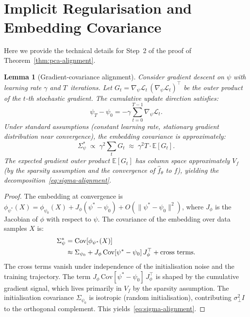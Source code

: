 \documentclass[11pt,a4paper]{article}
\theoremstyle{plain}
\newtheorem{lemma}[theorem]{Lemma}
\theoremstyle{definition}
\theoremstyle{remark}
\newcommand{\E}{\mathbb{E}}
\newcommand{\cL}{\mathcal{L}}
\newcommand{\norm}[1]{\| #1 \|}
\begin{document}
\appendix
\section{Implicit Regularisation and Embedding Covariance}%
\label{app:implicit-reg}

Here we provide the technical details for Step~2 of the proof of
Theorem~\ref{thm:pca-alignment}.

\begin{lemma}[Gradient-covariance alignment]\label{lem:grad-cov}
Consider gradient descent on $\psi$ with learning rate $\gamma$ and
$T$~iterations.  Let $G_t = \nabla_\psi \cL_t\,(\nabla_\psi \cL_t)^\top$ be the
outer product of the $t$-th stochastic gradient.  The cumulative update
direction satisfies:
\begin{equation}
  \psi_T - \psi_0
  = -\gamma \sum_{t=0}^{T-1} \nabla_\psi \cL_t.
\end{equation}
Under standard assumptions (constant learning rate, stationary gradient
distribution near convergence), the embedding covariance is approximately:
\begin{equation}
  \Sigma_\psi^* \;\propto\; \gamma^2 \sum_{t} G_t
  \;\approx\; \gamma^2 T \cdot \E[G_t].
\end{equation}
The expected gradient outer product $\E[G_t]$ has column space approximately
$V_f$ (by the sparsity assumption and the convergence of $\hat{f}_\theta$ to
$f$), yielding the decomposition~\eqref{eq:sigma-alignment}.
\end{lemma}

\begin{proof}
The embedding at convergence is $\phi_{\psi^*}(X) = \phi_{\psi_0}(X) +
J_\phi(\psi^* - \psi_0) + O(\norm{\psi^* - \psi_0}^2)$, where $J_\phi$ is the
Jacobian of $\phi$ with respect to $\psi$.  The covariance of the embedding over
data samples $X$ is:
\begin{align}
  \Sigma_\psi^*
  &= \mathrm{Cov}[\phi_{\psi^*}(X)] \notag\\
  &\approx \Sigma_{\psi_0} + J_\phi\,\mathrm{Cov}[\psi^* - \psi_0]\,J_\phi^\top
    + \text{cross terms}.
\end{align}
The cross terms vanish under independence of the initialisation noise and the
training trajectory.  The term
$J_\phi\,\mathrm{Cov}[\psi^* - \psi_0]\,J_\phi^\top$ is shaped by the
cumulative gradient signal, which lives primarily in $V_f$ by the sparsity
assumption.  The initialisation covariance $\Sigma_{\psi_0}$ is isotropic
(random initialisation), contributing $\sigma_\perp^2 I$ to the orthogonal
complement.  This yields~\eqref{eq:sigma-alignment}.
\end{proof}
\end{document}
